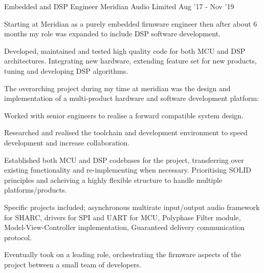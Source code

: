 \begin{cventries}
  \cventry
    {Embedded and DSP Engineer}
    {Meridian Audio Limited}
    {}
    {Aug '17 - Nov '19}
    {
      Starting at Meridian as a purely embedded firmware engineer then after about 6 months my role was expanded to include DSP software development.
      \begin{cvitems}
        \item{Developed, maintained and tested high quality code for both MCU and DSP architectures. Integrating new hardware, extending feature set for new products, tuning and developing DSP algorithms.}
        \item{The overarching project during my time at meridian was the design and implementation of a multi-product hardware and software development platform:}
        \begin{cvitems}
          \item{Worked with senior engineers to realise a forward compatible system design. }
          \item{Researched and realised the toolchain and development environment to speed development and increase collaboration.}
          \item{Established both MCU and DSP codebases for the project, transferring over existing functionality and re-implementing when necessary. Prioritising SOLID principles and acheiving a highly flexible structure to handle multiple platforms/products.}
          \item{Specific projects included; asynchronous multirate input/output audio framework for SHARC, drivers for SPI and UART for MCU, Polyphase Filter module, Model-View-Controller implementation, Guaranteed delivery communication protocol.}
          \item{Eventually took on a leading role, orchestrating the firmware aspects of the project between a small team of developers.}
        \end{cvitems}

\end{cvitems}}
\end{cventries}
